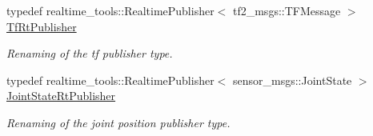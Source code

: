 \begin{DoxyCompactItemize}
\mbox{\label{namespacedynamic__graph_ac8d567b9a3d1ab846ba2efdc1ff1e120}} 
typedef realtime\+\_\+tools\+::\+Realtime\+Publisher$<$ tf2\+\_\+msgs\+::\+T\+F\+Message $>$ \hyperlink{namespacedynamic__graph_ac8d567b9a3d1ab846ba2efdc1ff1e120}{Tf\+Rt\+Publisher}
\begin{DoxyCompactList}\small\item\em Renaming of the tf publisher type. \end{DoxyCompactList}\item 
\mbox{\label{namespacedynamic__graph_ae9ad83c8174a9aa5bc1688df02b4ee95}} 
typedef realtime\+\_\+tools\+::\+Realtime\+Publisher$<$ sensor\+\_\+msgs\+::\+Joint\+State $>$ \hyperlink{namespacedynamic__graph_ae9ad83c8174a9aa5bc1688df02b4ee95}{Joint\+State\+Rt\+Publisher}
\begin{DoxyCompactList}\small\item\em Renaming of the joint position publisher type. \end{DoxyCompactList}\end{DoxyCompactItemize}

